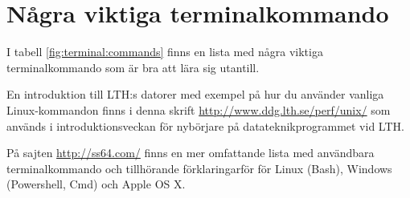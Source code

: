 \section{Några viktiga terminalkommando}

I tabell \ref{fig:terminal:commands} finns en lista med några viktiga terminalkommando som är bra att lära sig utantill.

En introduktion till LTH:s datorer med exempel på hur du använder vanliga Linux-kommandon finns i denna skrift \url{http://www.ddg.lth.se/perf/unix/} som används i introduktionsveckan för nybörjare på datateknikprogrammet vid LTH.

På sajten \url{http://ss64.com/} finns en mer omfattande lista med användbara terminalkommando och tillhörande förklaringarför för Linux (Bash), Windows (Powershell, Cmd) och Apple OS X.  

